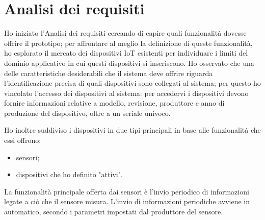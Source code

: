 %



%
%

\newpage

\section{Analisi dei requisiti}
\label{ar}

Ho iniziato l'Analisi dei requisiti cercando di capire quali funzionalità dovesse offrire il prototipo; per affrontare al meglio la definizione di queste funzionalità, ho esplorato il mercato dei dispositivi IoT esistenti per individuare i limiti del dominio applicativo in cui questi dispositivi si inseriscono.
Ho osservato che una delle caratteristiche desiderabili che il sistema deve offrire riguarda l'identificazione precisa di quali dispositivi sono collegati al sistema; per questo ho vincolato l'accesso dei dispositivi al sistema: per accedervi i dispositivi devono fornire informazioni relative a modello, revisione, produttore e anno di produzione del dispositivo, oltre a un seriale univoco.

Ho inoltre suddiviso i dispositivi in due tipi principali in base alle funzionalità che essi offrono:
\begin{itemize}
	\item sensori;
	\item dispositivi che ho definito "attivi".
\end{itemize}
La funzionalità principale offerta dai sensori è l'invio periodico di informazioni legate a ciò che il sensore misura.
L'invio di informazioni periodiche avviene in automatico, secondo i parametri impostati dal produttore del sensore.

